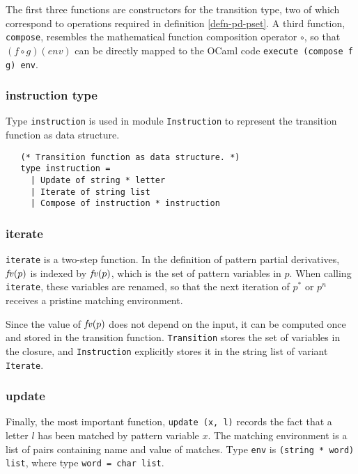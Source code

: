 The first three functions are constructors for the transition type, two of which
correspond to operations required in definition \ref{defn-pd-pset}. A third
function, \texttt{compose}, resembles the mathematical function composition
operator $\circ$, so that $(f \circ g)(\mathit{env})$ can be directly mapped to
the OCaml code \texttt{execute (compose f g) env}.


\subsubsection{instruction type}

Type \texttt{instruction} is used in module \texttt{Instruction} to represent
the transition function as data structure.

\begin{lstlisting}
   (* Transition function as data structure. *)
   type instruction =
     | Update of string * letter
     | Iterate of string list
     | Compose of instruction * instruction
\end{lstlisting}


\subsubsection{iterate}

\texttt{iterate} is a two-step function. In the definition of pattern partial
derivatives, $\iteratefvp$ is indexed by $\mathit{fv}(p)$, which is the set of pattern
variables in $p$. When calling \texttt{iterate}, these variables are renamed, so
that the next iteration of $p^*$ or $p^n$ receives a pristine matching
environment.

Since the value of $\mathit{fv}(p)$ does not depend on the input, it can be computed
once and stored in the transition function. \texttt{Transition} stores the set
of variables in the closure, and \texttt{Instruction} explicitly stores it in
the string list of variant \texttt{Iterate}.


\subsubsection{update}

Finally, the most important function, \texttt{update (x, l)} records the fact
that a letter $l$ has been matched by pattern variable $x$. The matching
environment is a list of pairs containing name and value of matches. Type
\texttt{env} is \texttt{(string * word) list}, where type \texttt{word = char
list}.


